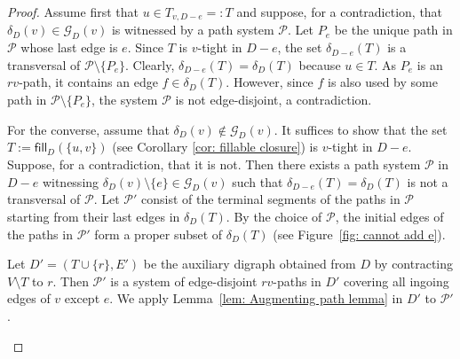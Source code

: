 \documentclass[12pt,a4paper]{amsart}
\theoremstyle{plain}
\theoremstyle{definition}
\begin{document}
\begin{proof}
Assume first that $u\in T_{v,D-e}=:T$ and suppose, for a contradiction, that $\delta_D(v)\in\mathcal{G}_D(v)$ is witnessed by a path system 
$\mathcal{P}$.
Let $P_e$ be the unique path in $\mathcal{P}$ whose last edge is $e$.
Since $T$ is $v$-tight in $D-e$, the set $\delta_{D-e}(T)$ is a transversal of $\mathcal{P}\setminus\{P_e\}$.
Clearly, $\delta_{D-e}(T)=\delta_D(T)$ because $u\in T$.
As $P_e$ is an $rv$-path, it contains an edge $f\in\delta_D(T)$.
However, since $f$ is also used by some path in $\mathcal{P}\setminus\{P_e\}$, the system $\mathcal{P}$ is not edge-disjoint, a contradiction.

For the converse, assume that $\delta_D(v)\notin\mathcal{G}_D(v)$.
It suffices to show that the set $T:=\mathsf{fill}_D(\{u,v\})$ (see Corollary \ref{cor: fillable closure}) is $v$-tight in $D-e$.
Suppose, for a contradiction, that it is not.
Then there exists a path system $\mathcal{P}$ in $D-e$ witnessing
$\delta_D(v)\setminus\{e\}\in\mathcal{G}_D(v)$ such that $\delta_{D-e}(T)=\delta_D(T)$ is not a transversal of $\mathcal{P}$.
Let $\mathcal{P}'$ consist of the terminal segments of the paths in $\mathcal{P}$ starting from their last edges in $\delta_D(T)$.
By the choice of $\mathcal{P}$, the initial edges of the paths in $\mathcal{P}'$ form a proper subset of $\delta_D(T)$ (see Figure~\ref{fig: cannot 
add e}).

Let $D'=(T\cup\{r\},E')$ be the auxiliary digraph obtained from $D$ by contracting $V\setminus T$ to $r$.
Then $\mathcal{P}'$ is a system of edge-disjoint $rv$-paths in $D'$ covering all ingoing edges of $v$ except $e$.
We apply Lemma~\ref{lem: Augmenting path lemma} in $D'$ to $\mathcal{P}'$.
   \begin{figure}[h]
     \centering
     
\end{figure}
\end{proof}
\end{document}
